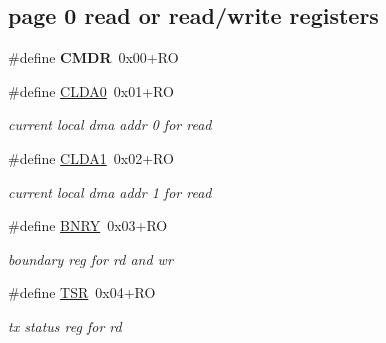 \subsection*{page 0 read or read/write registers}
\begin{DoxyCompactItemize}
\item 
\mbox{\label{group__gumstix__dp8390_ga85abb2679919f2276391769e7073bfb9}} 
\#define {\bfseries C\+M\+DR}~0x00+\+RO
\item 
\mbox{\label{group__gumstix__dp8390_ga719624d97dfe65fb7600f18e1bb348cc}} 
\#define \mbox{\hyperlink{group__gumstix__dp8390_ga719624d97dfe65fb7600f18e1bb348cc}{C\+L\+D\+A0}}~0x01+\+RO
\begin{DoxyCompactList}\small\item\em current local dma addr 0 for read \end{DoxyCompactList}\item 
\mbox{\label{group__gumstix__dp8390_ga1e7d20a817c3ebf74745d0f713b5eea6}} 
\#define \mbox{\hyperlink{group__gumstix__dp8390_ga1e7d20a817c3ebf74745d0f713b5eea6}{C\+L\+D\+A1}}~0x02+\+RO
\begin{DoxyCompactList}\small\item\em current local dma addr 1 for read \end{DoxyCompactList}\item 
\mbox{\label{group__gumstix__dp8390_gaa0104a6544d6dce2404cbc91bc520e9b}} 
\#define \mbox{\hyperlink{group__gumstix__dp8390_gaa0104a6544d6dce2404cbc91bc520e9b}{B\+N\+RY}}~0x03+\+RO
\begin{DoxyCompactList}\small\item\em boundary reg for rd and wr \end{DoxyCompactList}\item 
\mbox{\label{group__gumstix__dp8390_ga46e8332f503aad40d24988b6d297a496}} 
\#define \mbox{\hyperlink{group__gumstix__dp8390_ga46e8332f503aad40d24988b6d297a496}{T\+SR}}~0x04+\+RO
\begin{DoxyCompactList}\small\item\em tx status reg for rd \end{DoxyCompactList}\item 
\mbox{\label{group__gumstix__dp8390_gada4041894ef78d756b1059f29edaa58d}} 

\end{DoxyCompactItemize}

